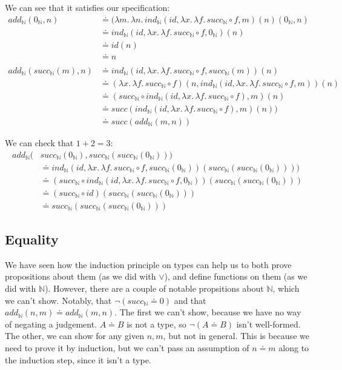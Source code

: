 \documentclass[a4paper, 12pt]{article}
\newcommand{\N}{\mathbb{N}}
\newcommand{\la}[1]{\lambda{#1}.\,}
\theoremstyle{changedot}
\theoremstyle{changedotbreak}
\theoremstyle{nonumberplain}
\begin{document}
We can see that it satisfies our specification:
\begin{align*}
  add_{\N}(0_{\N}, n) &\doteq (\la m \la n ind_{\N}(id, \la x \la f succ_{\N} \circ f, m)(n)(0_{\N}, n) \\
  &\doteq ind_{\N}(id, \la x \la f succ_{\N} \circ f, 0_{\N})(n) \\
                 &\doteq id(n) \\
                 &\doteq n \\ \\
  add_{\N}(succ_{\N}(m), n) &\doteq ind_{\N}(id, \la x \la f succ_{\N} \circ f, succ_{\N}(m))(n) \\
                 &\doteq (\la x \la f succ_{\N} \circ f)(n, ind_{\N}(id, \la x \la f succ_{\N} \circ f, m))(n) \\
                 &\doteq (succ_{\N} \circ ind_{\N}(id, \la x \la f succ_{\N} \circ f), m)(n) \\
                 &\doteq succ(ind_{\N}(id, \la x \la f succ_{\N} \circ f), m)(n)) \\
  &\doteq succ(add_{\N}(m, n))
\end{align*}

We can check that $1+2=3$:
\begin{align*}
  add_{\N}(&succ_{\N}(0_{\N}), succ_{\N}(succ_{\N}(0_{\N}))) \\
           &\doteq ind_{\N}(id, \la x \la f succ_{\N} \circ f, succ_{\N}(0_{\N}))(succ_{\N}(succ_{\N}(0_{\N})))) \\
  &\doteq (succ_{\N}\circ ind_{\N}(id, \la x \la f succ_{\N} \circ f, 0_{\N}))(succ_{\N}(succ_{\N}(0_{\N}))) \\
           &\doteq (succ_{\N} \circ id)(succ_{\N}(succ_{\N}(0_{\N}))) \\
  &\doteq succ_{\N}(succ_{\N}(succ_{\N}(0_{\N})))
\end{align*}

\subsection{Equality}
We have seen how the induction principle on types can help us to both prove propositions about them (as we did with $\lor$), and define functions on them (as we did with $\N$). However, there are a couple of notable propsitions about $\N$, which we can't show. Notably, that $\neg(succ_{\N} \doteq 0)$ and that $add_{\N}(n, m) \doteq add_{\N}(m, n)$. The first we can't show, because we have no way of negating a judgement. $A \doteq B$ is not a type, so $\neg (A \doteq B)$ isn't well-formed. The other, we can show for any given $n, m$, but not in general. This is because we need to prove it by induction, but we can't pass an assumption of $n\doteq m$ along to the induction step, since it isn't a type.
\end{document}
